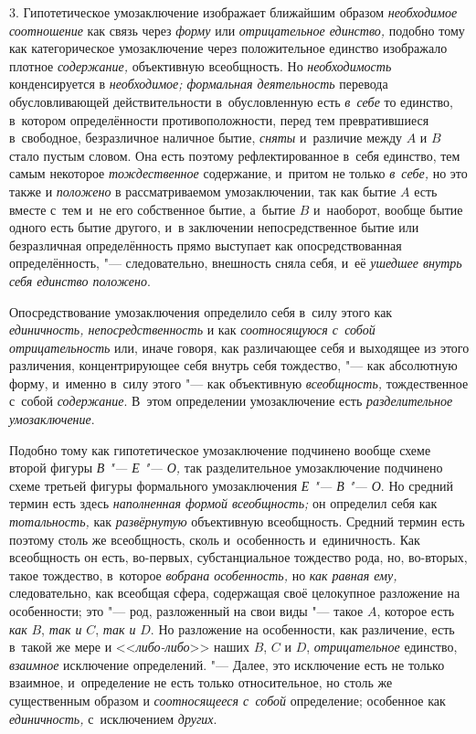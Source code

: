 3. Гипотетическое умозаключение изображает ближайшим образом
{\em необходимое соотношение}
как связь через {\em форму} или {\em отрицательное единство,}
подобно тому как категорическое умозаключение через
положительное единство изображало плотное
{\em содержание,} объективную всеобщность. Но {\em необходимость}
конденсируется в {\em необходимое; формальная деятельность}
перевода обусловливающей действительности в~обусловленную есть {\em в~себе} то
единство, в~котором определённости противоположности, перед тем
превратившиеся в~свободное, безразличное наличное бытие,
{\em сняты} и~различие между $A$ и $B$ стало пустым
словом. Она есть поэтому рефлектированное в~себя единство,
тем самым некоторое {\em тождественное}
содержание, и~притом не только {\em в~себе,} но это также и {\em положено} в
рассматриваемом умозаключении, так как бытие $A$ есть вместе с~тем
и~не его собственное бытие, а~бытие $B$ и~наоборот,
вообще бытие одного есть бытие другого, и~в заключении непосредственное
бытие или безразличная определённость прямо выступает как опосредствованная
определённость, "--- следовательно, внешность сняла себя, и~её
{\em ушедшее внутрь себя единство положено}.

Опосредствование умозаключения определило себя в~силу этого
как {\em единичность, непосредственность} и
как {\em соотносящуюся с~собой
отрицательность} или, иначе говоря, как различающее себя и
выходящее из этого различения, концентрирующее себя внутрь себя тождество,
"--- как абсолютную форму, и~именно в~силу этого "--- как объективную
{\em всеобщность,} тождественное с~собой {\em содержание}. В~этом
определении умозаключение есть {\em разделительное умозаключение}.


Подобно тому как гипотетическое умозаключение подчинено вообще
схеме второй фигуры {\em В "--- Е "--- О,} так разделительное
умозаключение подчинено схеме третьей фигуры формального умозаключения
{\em Е "--- В "--- О}. Но средний термин есть здесь
{\em наполненная формой всеобщность;}
он определил себя как {\em тотальность,} как {\em развёрнутую}
объективную всеобщность. Средний термин есть поэтому столь же
всеобщность, сколь и~особенность и~единичность. Как всеобщность он есть,
во-первых, субстанциальное тождество рода, но, во-вторых, такое тождество,
в~которое {\em вобрана особенность,} но {\em как равная ему,}
следовательно, как всеобщая сфера, содержащая своё целокупное
разложение на особенности; это "--- род, разложенный на свои
виды "--- такое $A$,
которое есть {\em как} $B$, {\em так и} $C$, {\em так и} $D$. Но
разложение на особенности, как различение, есть в~такой же мере и
<<{\em либо-либо}>> наших $B$, $C$ и $D$, {\em отрицательное}
единство, {\em взаимное} исключение определений. "--- Далее, это
исключение есть не только взаимное, и~определение не есть только
относительное, но столь же существенным образом и {\em соотносящееся с~собой}
определение; особенное как {\em единичность,} с~исключением {\em других}.

